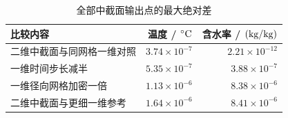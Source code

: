 \begin{table}[H]
\centering\small
\caption{全部中截面输出点的最大绝对差}\label{tab:verification}
\begin{tabular}{lrr}
\toprule
比较内容 & 温度 / $\celsius$ & 含水率 / $(\kgkg)$\\
\midrule
二维中截面与同网格一维对照 & $3.74\times10^{-7}$ & $2.21\times10^{-12}$ \\
一维时间步长减半 & $5.35\times10^{-7}$ & $3.88\times10^{-7}$ \\
一维径向网格加密一倍 & $1.13\times10^{-6}$ & $8.38\times10^{-6}$ \\
二维中截面与更细一维参考 & $1.64\times10^{-6}$ & $8.41\times10^{-6}$ \\
\bottomrule
\end{tabular}
\end{table}
